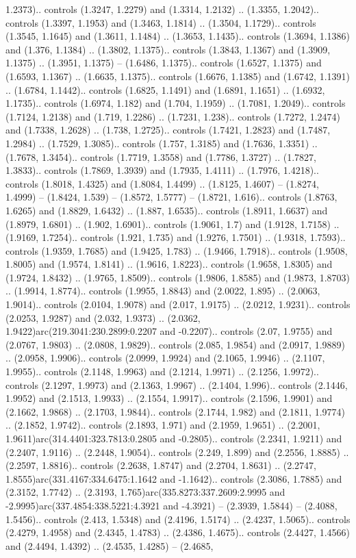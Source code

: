 1.2373).. controls (1.3247, 1.2279) and (1.3314, 1.2132) .. (1.3355, 1.2042).. controls (1.3397, 1.1953) and (1.3463, 1.1814) .. (1.3504, 1.1729).. controls (1.3545, 1.1645) and (1.3611, 1.1484) .. (1.3653, 1.1435).. controls (1.3694, 1.1386) and (1.376, 1.1384) .. (1.3802, 1.1375).. controls (1.3843, 1.1367) and (1.3909, 1.1375) .. (1.3951, 1.1375) -- (1.6486, 1.1375).. controls (1.6527, 1.1375) and (1.6593, 1.1367) .. (1.6635, 1.1375).. controls (1.6676, 1.1385) and (1.6742, 1.1391) .. (1.6784, 1.1442).. controls (1.6825, 1.1491) and (1.6891, 1.1651) .. (1.6932, 1.1735).. controls (1.6974, 1.182) and (1.704, 1.1959) .. (1.7081, 1.2049).. controls (1.7124, 1.2138) and (1.719, 1.2286) .. (1.7231, 1.238).. controls (1.7272, 1.2474) and (1.7338, 1.2628) .. (1.738, 1.2725).. controls (1.7421, 1.2823) and (1.7487, 1.2984) .. (1.7529, 1.3085).. controls (1.757, 1.3185) and (1.7636, 1.3351) .. (1.7678, 1.3454).. controls (1.7719, 1.3558) and (1.7786, 1.3727) .. (1.7827, 1.3833).. controls (1.7869, 1.3939) and (1.7935, 1.4111) .. (1.7976, 1.4218).. controls (1.8018, 1.4325) and (1.8084, 1.4499) .. (1.8125, 1.4607) -- (1.8274, 1.4999) -- (1.8424, 1.539) -- (1.8572, 1.5777) -- (1.8721, 1.616).. controls (1.8763, 1.6265) and (1.8829, 1.6432) .. (1.887, 1.6535).. controls (1.8911, 1.6637) and (1.8979, 1.6801) .. (1.902, 1.6901).. controls (1.9061, 1.7) and (1.9128, 1.7158) .. (1.9169, 1.7254).. controls (1.921, 1.735) and (1.9276, 1.7501) .. (1.9318, 1.7593).. controls (1.9359, 1.7685) and (1.9425, 1.783) .. (1.9466, 1.7918).. controls (1.9508, 1.8005) and (1.9574, 1.8141) .. (1.9616, 1.8223).. controls (1.9658, 1.8305) and (1.9724, 1.8432) .. (1.9765, 1.8509).. controls (1.9806, 1.8585) and (1.9873, 1.8703) .. (1.9914, 1.8774).. controls (1.9955, 1.8843) and (2.0022, 1.895) .. (2.0063, 1.9014).. controls (2.0104, 1.9078) and (2.017, 1.9175) .. (2.0212, 1.9231).. controls (2.0253, 1.9287) and (2.032, 1.9373) .. (2.0362, 1.9422)arc(219.3041:230.2899:0.2207 and -0.2207).. controls (2.07, 1.9755) and (2.0767, 1.9803) .. (2.0808, 1.9829).. controls (2.085, 1.9854) and (2.0917, 1.9889) .. (2.0958, 1.9906).. controls (2.0999, 1.9924) and (2.1065, 1.9946) .. (2.1107, 1.9955).. controls (2.1148, 1.9963) and (2.1214, 1.9971) .. (2.1256, 1.9972).. controls (2.1297, 1.9973) and (2.1363, 1.9967) .. (2.1404, 1.996).. controls (2.1446, 1.9952) and (2.1513, 1.9933) .. (2.1554, 1.9917).. controls (2.1596, 1.9901) and (2.1662, 1.9868) .. (2.1703, 1.9844).. controls (2.1744, 1.982) and (2.1811, 1.9774) .. (2.1852, 1.9742).. controls (2.1893, 1.971) and (2.1959, 1.9651) .. (2.2001, 1.9611)arc(314.4401:323.7813:0.2805 and -0.2805).. controls (2.2341, 1.9211) and (2.2407, 1.9116) .. (2.2448, 1.9054).. controls (2.249, 1.899) and (2.2556, 1.8885) .. (2.2597, 1.8816).. controls (2.2638, 1.8747) and (2.2704, 1.8631) .. (2.2747, 1.8555)arc(331.4167:334.6475:1.1642 and -1.1642).. controls (2.3086, 1.7885) and (2.3152, 1.7742) .. (2.3193, 1.765)arc(335.8273:337.2609:2.9995 and -2.9995)arc(337.4854:338.5221:4.3921 and -4.3921) -- (2.3939, 1.5844) -- (2.4088, 1.5456).. controls (2.413, 1.5348) and (2.4196, 1.5174) .. (2.4237, 1.5065).. controls (2.4279, 1.4958) and (2.4345, 1.4783) .. (2.4386, 1.4675).. controls (2.4427, 1.4566) and (2.4494, 1.4392) .. (2.4535, 1.4285) -- (2.4685, 